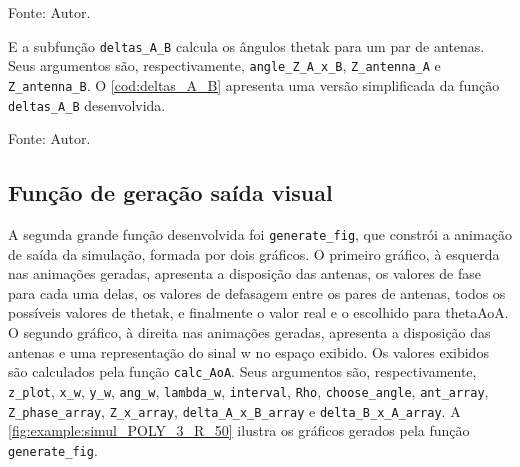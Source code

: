 \begin{lstfloat}[htbp]
	\centering
	
	\caption*{Fonte: Autor.}
\end{lstfloat}

E a subfunção \lstinline|deltas_A_B| calcula os ângulos \ac{thetak} para um par de antenas.
Seus argumentos são, respectivamente, \lstinline|angle_Z_A_x_B|, \lstinline|Z_antenna_A| e \lstinline|Z_antenna_B|.
O \autoref{cod:deltas_A_B} apresenta uma versão simplificada da função \lstinline|deltas_A_B| desenvolvida.

\begin{lstfloat}[htbp]
	\centering
	
	\caption*{Fonte: Autor.}
\end{lstfloat}

\subsection{Função de geração saída visual}


A segunda grande função desenvolvida foi \lstinline|generate_fig|, que constrói a animação de saída da simulação, formada por dois gráficos.
O primeiro gráfico, à esquerda nas animações geradas, apresenta a disposição das antenas, os valores de fase para cada uma delas, os valores de defasagem entre os pares de antenas, todos os possíveis valores de \ac{thetak}, e finalmente o valor real e o escolhido para \ac{thetaAoA}.
O segundo gráfico, à direita nas animações geradas, apresenta a disposição das antenas e uma representação do sinal \ac{w} no espaço exibido.
Os valores exibidos são calculados pela função \lstinline|calc_AoA|.
Seus argumentos são, respectivamente, \lstinline|z_plot|, \lstinline|x_w|, \lstinline|y_w|, \lstinline|ang_w|, \lstinline|lambda_w|, \lstinline|interval|, \lstinline|Rho|, \lstinline|choose_angle|, \lstinline|ant_array|, \lstinline|Z_phase_array|, \lstinline|Z_x_array|, \lstinline|delta_A_x_B_array| e \lstinline|delta_B_x_A_array|.
A \autoref{fig:example:simul_POLY_3_R_50} ilustra os gráficos gerados pela função \lstinline|generate_fig|.

